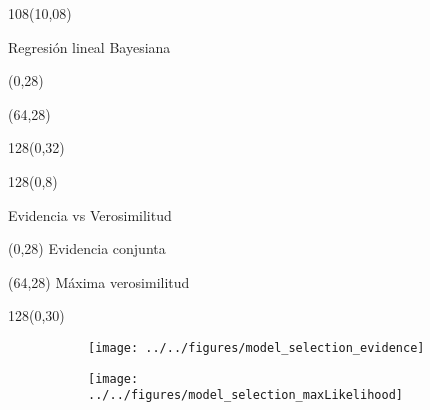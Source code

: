 \documentclass[shownotes]{beamer}
\begin{document}
\begin{frame}
\begin{textblock}{108}(10,08)
 \begin{center}
  \large Regresi\'on lineal Bayesiana
 \end{center}
\end{textblock}



\begin{textblock}{64}(0,28)
 \centering
\end{textblock}

\begin{textblock}{64}(64,28)
 \centering
\end{textblock}

\begin{textblock}{128}(0,32)
     \centering 
\end{textblock}

\end{frame}

\begin{frame}
\begin{textblock}{128}(0,8)
\begin{center}
 Evidencia vs Verosimilitud
\end{center}
\end{textblock}



\begin{textblock}{64}(0,28)
 \centering
Evidencia conjunta
\end{textblock}

\begin{textblock}{64}(64,28)
 \centering
 M\'axima verosimilitud
\end{textblock}


\begin{textblock}{128}(0,30)
     \centering 
       \begin{figure}[H]     
     \centering 
     \begin{subfigure}[b]{0.47\textwidth}
       \texttt{[image: ../../figures/model\_selection\_evidence]}
     \end{subfigure}
     \begin{subfigure}[b]{0.49\textwidth}
       \texttt{[image: ../../figures/model\_selection\_maxLikelihood]}
     \end{subfigure}
\end{figure}
\end{textblock}


\end{frame}
\end{document}
